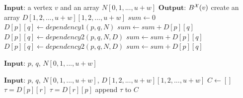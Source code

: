 \begin{algorithm}[t]
\label{alg:main}
\begin{algorithmic}[1]
\State $\mathbf{Input}$: a vertex $v$ and an array $N[0,1,...,u+w]$
\State $\mathbf{Output}$: $B^{\mathcal{X}}({v})$
\State create an array $D[1,2,...,u+w][1,2,...,u+w]$ 
\State $sum \gets 0$
		\State $D[p][q] \gets dependency1(p, q, N)$
		\State $sum \gets sum + D[p][q]$
	\EndFor
		\State $D[p][q] \gets dependency2(p, q, N, D)$
		\State $sum \gets sum + D[p][q]$
	\EndFor
\EndFor
{} 
		\State $D[p][q] \gets dependency2(p, q, N, D)$
		\State $sum \gets sum + D[p][q]$
	\EndFor
\EndFor
\State {} 
\caption{$x\mhyphen ego\_{betweenness}(v,N)$}\label{alg:main}

\end{algorithmic}
\end{algorithm}
\begin{algorithm}[t]
\begin{algorithmic}[1]
\State $\mathbf{Input}$: $p$, $q$, $N[0,1,...,u+w]$
	\State {} 
\Else
	\State {} 
\EndIf
\caption{$dependency1(p, q, N)$}
\label{alg:dependency1}
\end{algorithmic}
\end{algorithm}
\begin{algorithm}[t]
\begin{algorithmic}[1]
\State $\mathbf{Input}$: $p$, $q$, $N[0,1,...,u+w]$, $D[1,2,...,u+w][1,2,...,u+w]$
\State $C \gets []$\;
		\State $\tau = D[p][r]$
	\Else 
		\State $\tau = D[r][p]$
	\EndIf
		\State {} 
	\Else 
		\State append $\tau$ to $C$
	\EndIf
\EndFor
\State {}    
\caption{$dependency2(p, q, N, D)$}
\label{alg:dependency2}
\end{algorithmic}
\end{algorithm}


